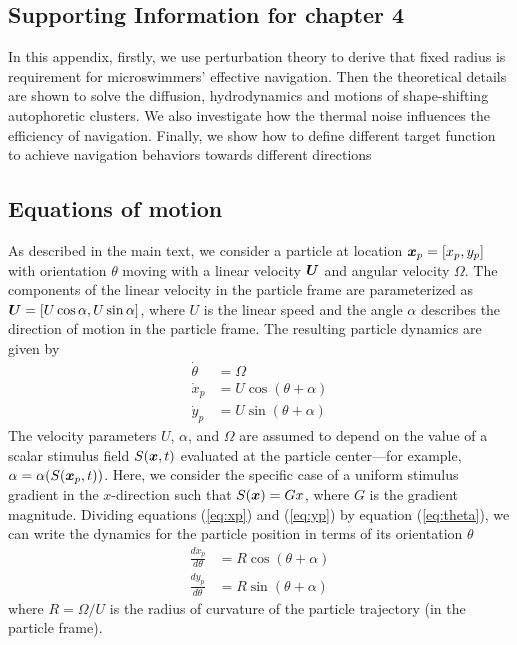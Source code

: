 \begin{appendices}



\chapter{Supporting Information for chapter 4}
In this appendix, firstly, we use perturbation theory to derive that fixed radius is requirement for microswimmers' effective navigation. Then the theoretical details are shown to solve the diffusion, hydrodynamics and motions of shape-shifting autophoretic clusters. We also investigate how the thermal noise influences the efficiency of navigation. Finally, we show how to define different target function to achieve navigation behaviors towards different directions 

\section{Equations of motion}

As described in the main text, we consider a particle at location $\boldsymbol{x}_p=[x_p,y_p]$ with orientation $\theta$ moving with a linear velocity $\boldsymbol{U}$ and angular velocity $\Omega$.  The components of the linear velocity in the particle frame are parameterized as $\boldsymbol{U}=[U \cos\alpha, U\sin \alpha]$, where $U$ is the linear speed and the angle $\alpha$ describes the direction of motion in the particle frame.  The resulting particle dynamics are given by
\begin{align}
    \dot{\theta} &= \Omega \label{eq:theta}
    \\ 
    \dot{x}_p &= U \cos(\theta + \alpha) \label{eq:xp} 
    \\ 
    \dot{y}_p &= U \sin(\theta + \alpha)\label{eq:yp}
\end{align}	
The velocity parameters $U$, $\alpha$, and $\Omega$ are assumed to depend on the value of a scalar stimulus field $S(\boldsymbol{x},t)$ evaluated at the particle center---for example, $\alpha=\alpha(S(\boldsymbol{x}_p,t))$. Here, we consider the specific case of a uniform stimulus gradient in the $x$-direction such that $S(\boldsymbol{x})= G x$, where $G$ is the gradient magnitude. Dividing equations (\ref{eq:xp}) and (\ref{eq:yp}) by equation (\ref{eq:theta}), we can write the dynamics for the particle position in terms of its orientation $\theta$ 
\begin{align}
    \frac{d x_p}{d\theta} &= R \cos(\theta + \alpha) \label{eq:xp2} 
    \\ 
    \frac{d y_p}{d\theta} &= R \sin(\theta + \alpha)\label{eq:yp2}
\end{align}	
where $R=\Omega/U$ is the radius of curvature of the particle trajectory (in the particle frame). 


\end{appendices}
